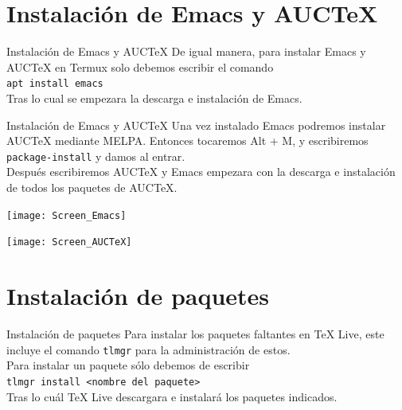 \documentclass[12pt,aspectratio=43]{beamer}
\newcommand{\lmr}{\fontfamily{lmr}\selectfont}
\begin{document}
\section{Instalación de Emacs y AUCTeX}
\begin{frame}{Instalación de Emacs y AUC{\TeX}}{}
De igual manera, para instalar Emacs y AUC{\TeX} en Termux solo debemos escribir el comando\\[1em]

\texttt{apt install emacs}\pause\\[1em]

Tras lo cual se empezara la descarga e instalación de Emacs.
\end{frame}

\begin{frame}{Instalación de Emacs y AUC{\TeX}}{}
Una vez instalado Emacs podremos instalar AUC{\TeX} mediante MELPA. Entonces tocaremos Alt + M, y escribiremos \texttt{package-install} y damos al entrar.\pause\\[1em]

Después escribiremos AUC{\TeX} y Emacs empezara con la descarga e instalación de todos los paquetes de AUC{\TeX}.
\end{frame}

\begin{frame}[plain]
\begin{center}
	\texttt{[image: Screen\_Emacs]}
\end{center}
\end{frame}

\begin{frame}[plain]
\begin{center}
	\texttt{[image: Screen\_AUCTeX]}
\end{center}
\end{frame}

\section{Instalación de paquetes}
\begin{frame}{Instalación de paquetes}{}
Para instalar los paquetes faltantes en {\lmr\TeX} Live, este incluye el comando \texttt{tlmgr} para la administración de estos.\pause\\[1em]

Para instalar un paquete sólo debemos de escribir\\[1em]

\texttt{tlmgr install <nombre del paquete>}\pause\\[1em]

Tras lo cuál {\lmr\TeX} Live descargara e instalará los paquetes indicados.
\end{frame}
\end{document}
